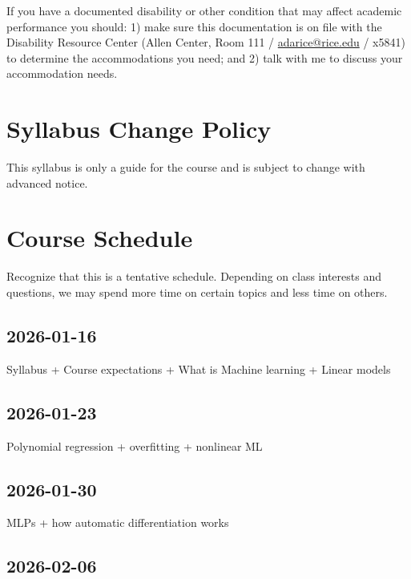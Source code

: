 \documentclass[11pt]{article}
\begin{document}
\begin{flushleft}
        If you have a documented disability or other condition that may affect
        academic performance you should: 1) make sure this documentation is on
        file with the Disability Resource Center (Allen Center, Room 111 /
        \href{mailto:adarice@rice.edu}{adarice@rice.edu} / x5841) to determine the
        accommodations you need; and 2) talk with me to discuss your accommodation
        needs.

        \section{Syllabus Change Policy}
        \label{syllabus-change-policy}

        This syllabus is only a guide for the course and is subject to change
        with advanced notice.

        \section{Course Schedule}
        \label{course-schedule}

        Recognize that this is a tentative schedule. Depending on class
        interests and questions, we may spend more time on certain topics and less
        time on others.

        \subsection{2026-01-16}
        \label{section}

        Syllabus + Course expectations + What is Machine learning + Linear
        models

        \subsection{2026-01-23}
        \label{section-1}

        Polynomial regression + overfitting + nonlinear ML

        \subsection{2026-01-30}
        \label{section-2}

        MLPs + how automatic differentiation works

        \subsection{2026-02-06}
        \label{section-3}


\end{flushleft}
\end{document}
